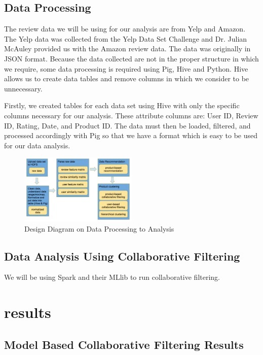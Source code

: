 \documentclass[conference]{IEEEtran}
\begin{document}
\subsection{Data Processing}

The review data we will be using for our analysis are from Yelp and Amazon.  The Yelp data was collected from the Yelp Data Set Challenge and Dr. Julian McAuley provided us with the Amazon review data.  The data was originally in JSON format.  Because the data collected are not in the proper structure in which we require, some data processing is required using Pig, Hive and Python.  Hive allows us to create data tables and remove columns in which we consider to be unnecessary.

Firstly, we created tables for each data set using Hive with only the specific columns necessary for our analysis. These  attribute columns are: User ID, Review ID, Rating, Date, and Product ID. The data must then be loaded, filtered, and processed accordingly with Pig so that we have a format which is easy to be used for our data analysis.

\begin{figure}[h]
\centering
\includegraphics[width=0.5\textwidth]{image/design_diagram}
\caption{Design Diagram on Data Processing to Analysis}
\end{figure}

\subsection{Data Analysis Using Collaborative Filtering}

We will be using Spark and their MLlib to run collaborative filtering.

\section{results}

\subsection{Model Based Collaborative Filtering Results}
\end{document}
